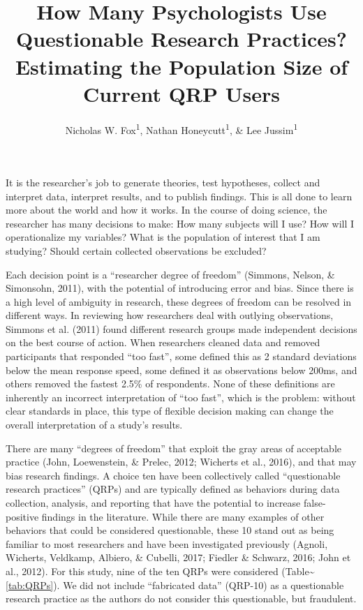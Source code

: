 \documentclass[,jou]{apa6}
\title{How Many Psychologists Use Questionable Research Practices? Estimating
the Population Size of Current QRP Users}
\author{Nicholas W. Fox\textsuperscript{1}, Nathan Honeycutt\textsuperscript{1},
\& Lee Jussim\textsuperscript{1}}
\date{}
\affiliation{
\vspace{0.5cm}
\textsuperscript{1} Rutgers University}
\theoremstyle{definition}
\theoremstyle{definition}
\theoremstyle{definition}
\theoremstyle{remark}
\begin{document}
\maketitle

It is the researcher's job to generate theories, test hypotheses,
collect and interpret data, interpret results, and to publish findings.
This is all done to learn more about the world and how it works. In the
course of doing science, the researcher has many decisions to make: How
many subjects will I use? How will I operationalize my variables? What
is the population of interest that I am studying? Should certain
collected observations be excluded?

Each decision point is a \enquote{researcher degree of freedom}
(Simmons, Nelson, \& Simonsohn, 2011), with the potential of introducing
error and bias. Since there is a high level of ambiguity in research,
these degrees of freedom can be resolved in different ways. In reviewing
how researchers deal with outlying observations, Simmons et al. (2011)
found different research groups made independent decisions on the best
course of action. When researchers cleaned data and removed participants
that responded \enquote{too fast}, some defined this as 2 standard
deviations below the mean response speed, some defined it as
observations below 200ms, and others removed the fastest 2.5\% of
respondents. None of these definitions are inherently an incorrect
interpretation of \enquote{too fast}, which is the problem: without
clear standards in place, this type of flexible decision making can
change the overall interpretation of a study's results.

There are many \enquote{degrees of freedom} that exploit the gray areas
of acceptable practice (John, Loewenstein, \& Prelec, 2012; Wicherts et
al., 2016), and that may bias research findings. A choice ten have been
collectively called \enquote{questionable research practices} (QRPs) and
are typically defined as behaviors during data collection, analysis, and
reporting that have the potential to increase false-positive findings in
the literature. While there are many examples of other behaviors that
could be considered questionable, these 10 stand out as being familiar
to most researchers and have been investigated previously (Agnoli,
Wicherts, Veldkamp, Albiero, \& Cubelli, 2017; Fiedler \& Schwarz, 2016;
John et al., 2012). For this study, nine of the ten QRPs were considered
(Table\textasciitilde{}\ref{tab:QRPs}). We did not include
\enquote{fabricated data} (QRP-10) as a questionable research practice
as the authors do not consider this questionable, but fraudulent.
\end{document}
